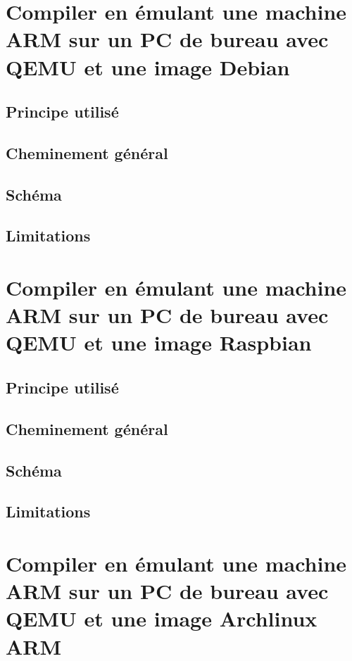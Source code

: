 \documentclass[11pt,a4paper,oneside]{article}
\begin{document}
\section{Compiler en émulant une machine ARM sur un PC de bureau avec QEMU et une image Debian}

\subsection{Principe utilisé}

\subsection{Cheminement général}

\subsection{Schéma}

\subsection{Limitations}




\section{Compiler en émulant une machine ARM sur un PC de bureau avec QEMU et une image Raspbian}

\subsection{Principe utilisé}

\subsection{Cheminement général}

\subsection{Schéma}

\subsection{Limitations}



\section{Compiler en émulant une machine ARM sur un PC de bureau avec QEMU et une image Archlinux ARM}
\end{document}
